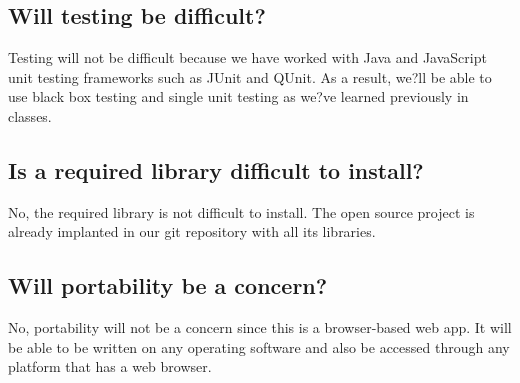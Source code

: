 \documentclass[11pt, oneside]{article}   	%
\begin{document}
\subsection*{Will testing be difficult?}

Testing will not be difficult because we have worked with Java and JavaScript unit testing frameworks such as JUnit and QUnit. As a result, we?ll be able to use black box testing and single unit testing as we?ve learned previously in classes. 

\subsection*{Is a required library difficult to install?}

No, the required library is not difficult to install. The open source project is already implanted in our git repository with all its libraries. 

\subsection*{Will portability be a concern?}

No, portability will not be a concern since this is a browser-based web app. It will be able to be written on any operating software and also be accessed through any platform that has a web browser.
\end{document}
